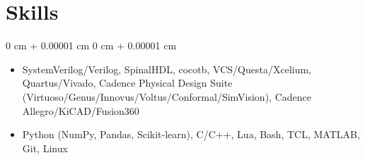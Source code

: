 \documentclass[10pt, letterpaper]{article}
\newlength{\betweenEntriesSpace}
\newlength{\bulletsTopSep}
\newlength{\bulletsParsep}
\newenvironment{highlights}{
    \begin{itemize}[
        label=-,
        topsep=\bulletsTopSep,
        parsep=\bulletsParsep,
        partopsep=0pt,
        itemsep=0pt,
        leftmargin=0 cm + 10pt
    ]
}{
    \end{itemize}
} %
\newenvironment{onecolentry}{
    \begin{adjustwidth}{
        0 cm + 0.00001 cm
    }{
        0 cm + 0.00001 cm
    }
}{
    \end{adjustwidth}
} %
\begin{document}
        \vspace{\betweenEntriesSpace} %

        \section{Skills}

        \begin{onecolentry}
            \begin{highlights}
                \item SystemVerilog/Verilog, SpinalHDL, cocotb, VCS/Questa/Xcelium, Quartus/Vivado, Cadence Physical Design Suite (Virtuoso/Genus/Innovus/Voltus/Conformal/SimVision), Cadence Allegro/KiCAD/Fusion360
                \item Python (NumPy, Pandas, Scikit-learn), C/C++, Lua, Bash, TCL, MATLAB, Git, Linux
            \end{highlights}
        \end{onecolentry}
    \vspace*{\fill}
\end{document}
